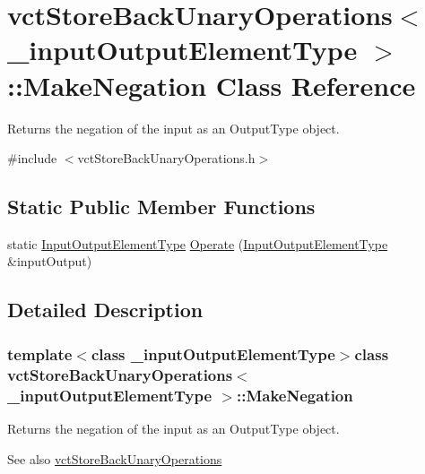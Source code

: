 \hypertarget{classvct_store_back_unary_operations_1_1_make_negation}{}\section{vct\+Store\+Back\+Unary\+Operations$<$ \+\_\+input\+Output\+Element\+Type $>$\+:\+:Make\+Negation Class Reference}
\label{classvct_store_back_unary_operations_1_1_make_negation}


Returns the negation of the input as an Output\+Type object.  




{\ttfamily \#include $<$vct\+Store\+Back\+Unary\+Operations.\+h$>$}

\subsection*{Static Public Member Functions}
\begin{DoxyCompactItemize}
\item 
static \hyperlink{classvct_store_back_unary_operations_a8af17faaa73a8d090094d468eee32062}{Input\+Output\+Element\+Type} \hyperlink{classvct_store_back_unary_operations_1_1_make_negation_ad0167cb78e533cbf02fa7ccdc5986691}{Operate} (\hyperlink{classvct_store_back_unary_operations_a8af17faaa73a8d090094d468eee32062}{Input\+Output\+Element\+Type} \&input\+Output)
\end{DoxyCompactItemize}


\subsection{Detailed Description}
\subsubsection*{template$<$class \+\_\+input\+Output\+Element\+Type$>$class vct\+Store\+Back\+Unary\+Operations$<$ \+\_\+input\+Output\+Element\+Type $>$\+::\+Make\+Negation}

Returns the negation of the input as an Output\+Type object. 

\begin{DoxySeeAlso}{See also}
\hyperlink{classvct_store_back_unary_operations}{vct\+Store\+Back\+Unary\+Operations} 
\end{DoxySeeAlso}


